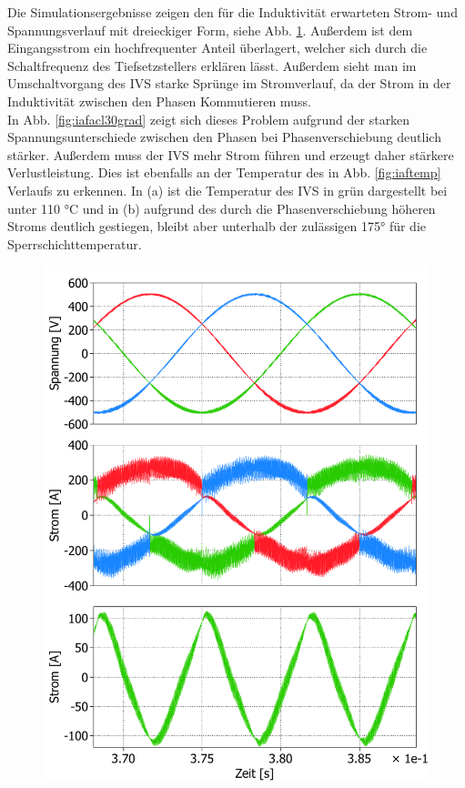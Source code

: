 Die Simulationsergebnisse zeigen den für die Induktivität erwarteten Strom- und Spannungsverlauf mit dreieckiger Form, siehe Abb. \ref{fig:iafacl}. Außerdem ist dem Eingangsstrom ein hochfrequenter Anteil überlagert, welcher sich durch die Schaltfrequenz des Tiefsetzstellers erklären lässt. Außerdem sieht man im Umschaltvorgang des \gls{IVS} starke Sprünge im Stromverlauf, da der Strom in der Induktivität zwischen den Phasen Kommutieren muss.\\
In Abb. \ref{fig:iafacl30grad} zeigt sich dieses Problem aufgrund der starken Spannungsunterschiede zwischen den Phasen bei Phasenverschiebung deutlich stärker. Außerdem muss der \gls{IVS} mehr Strom führen und erzeugt daher stärkere Verlustleistung. Dies ist ebenfalls an der Temperatur des in Abb. \ref{fig:iaftemp} Verlaufs zu erkennen. In (a) ist die Temperatur des IVS in grün dargestellt bei unter 110 °C und in (b) aufgrund des durch die Phasenverschiebung höheren Stroms deutlich gestiegen, bleibt aber unterhalb der zulässigen 175° für die Sperrschichttemperatur.
\begin{figure}
	\centering
	\includegraphics[width=1\linewidth]{content/Grafiken/IAF_AC+L}
	\caption[Simulationsergebnisse des IAF ohne Phasenverschiebung, Eingangsspannung und Ströme, Strom in der IVS Induktivität ]{}
	\label{fig:iafacl}
\end{figure}

